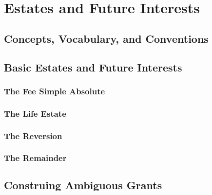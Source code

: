 \chapter{Estates and Future Interests}





\section{Concepts, Vocabulary, and Conventions}





\section{Basic Estates and Future Interests}



\subsection{The Fee Simple Absolute}




\subsection{The Life Estate}




\subsection{The Reversion}




\subsection{The Remainder}




\begin{questions}

\end{questions}

\section{Construing Ambiguous Grants}

